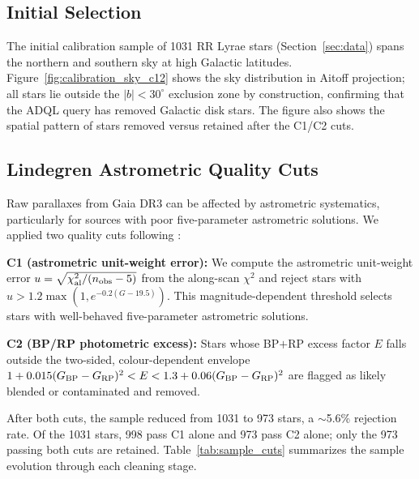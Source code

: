 \documentclass[10pt,preprint2]{aastex}
\begin{document}
\subsection{Initial Selection}

The initial calibration sample of 1031 RR Lyrae stars (Section~\ref{sec:data}) spans the northern and southern sky at high Galactic latitudes. Figure~\ref{fig:calibration_sky_c12} shows the sky distribution in Aitoff projection; all stars lie outside the $|b| < 30^\circ$ exclusion zone by construction, confirming that the ADQL query has removed Galactic disk stars. The figure also shows the spatial pattern of stars removed versus retained after the C1/C2 cuts.

\subsection{Lindegren Astrometric Quality Cuts}

Raw parallaxes from Gaia DR3 can be affected by astrometric systematics, particularly for sources with poor five-parameter astrometric solutions. We applied two quality cuts following \citet{Lindegren2021}:

\textbf{C1 (astrometric unit-weight error):} We compute the astrometric unit-weight error $u = \sqrt{\chi^2_{\rm al}/(n_{\rm obs}-5)}$ from the along-scan $\chi^2$ and reject stars with $u > 1.2\max(1, e^{-0.2(G-19.5)})$. This magnitude-dependent threshold selects stars with well-behaved five-parameter astrometric solutions.

\textbf{C2 (BP/RP photometric excess):} Stars whose BP$+$RP excess factor $E$ falls outside the two-sided, colour-dependent envelope $1 + 0.015(G_{\rm BP}-G_{\rm RP})^2 < E < 1.3 + 0.06(G_{\rm BP}-G_{\rm RP})^2$ are flagged as likely blended or contaminated and removed.

After both cuts, the sample reduced from 1031 to 973 stars, a $\sim$5.6\% rejection rate. Of the 1031 stars, 998 pass C1 alone and 973 pass C2 alone; only the 973 passing both cuts are retained. Table~\ref{tab:sample_cuts} summarizes the sample evolution through each cleaning stage.
\end{document}
